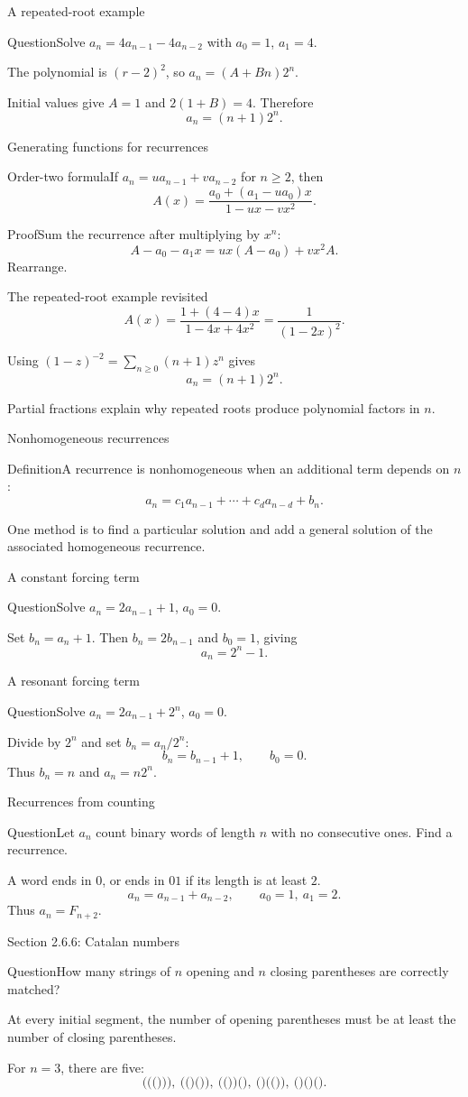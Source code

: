 \documentclass[aspectratio=169,11pt]{beamer}
\newcommand{\Def}[2]{\begin{block}{#1}#2\end{block}}
\newcommand{\Thm}[2]{\begin{block}{#1}#2\end{block}}
\renewcommand{\Proof}[1]{\begin{block}{Proof}\normalsize #1\end{block}}
\newcommand{\Question}[1]{\begin{block}{Question}#1\end{block}}
\newcommand{\gap}{\par\medskip}
\begin{document}
\begin{frame}{A repeated-root example}
\large
\Question{Solve $a_n=4a_{n-1}-4a_{n-2}$ with $a_0=1$, $a_1=4$.}
\gap The polynomial is $(r-2)^2$, so $a_n=(A+Bn)2^n$.
\gap Initial values give $A=1$ and $2(1+B)=4$. Therefore
\[a_n=(n+1)2^n.\]
\end{frame}
\begin{frame}{Generating functions for recurrences}
\large
\Thm{Order-two formula}{If $a_n=ua_{n-1}+va_{n-2}$ for $n\geq2$, then
\[A(x)=\frac{a_0+(a_1-ua_0)x}{1-ux-vx^2}.\]}
\Proof{Sum the recurrence after multiplying by $x^n$:
\[A-a_0-a_1x=ux(A-a_0)+vx^2A.\]
Rearrange.}
\end{frame}
\begin{frame}{The repeated-root example revisited}
\large
\[A(x)=\frac{1+(4-4)x}{1-4x+4x^2}=\frac1{(1-2x)^2}.\]
\gap Using $(1-z)^{-2}=\sum_{n\geq0}(n+1)z^n$ gives
\[a_n=(n+1)2^n.\]
\gap Partial fractions explain why repeated roots produce polynomial factors in $n$.
\end{frame}
\begin{frame}{Nonhomogeneous recurrences}
\large
\Def{Definition}{A recurrence is nonhomogeneous when an additional term depends on $n$:
\[a_n=c_1a_{n-1}+\cdots+c_da_{n-d}+b_n.\]}
\gap One method is to find a particular solution and add a general solution of the associated homogeneous recurrence.
\end{frame}
\begin{frame}{A constant forcing term}
\large
\Question{Solve $a_n=2a_{n-1}+1$, $a_0=0$.}
\gap Set $b_n=a_n+1$. Then $b_n=2b_{n-1}$ and $b_0=1$, giving
\[a_n=2^n-1.\]
\end{frame}
\begin{frame}{A resonant forcing term}
\large
\Question{Solve $a_n=2a_{n-1}+2^n$, $a_0=0$.}
\gap Divide by $2^n$ and set $b_n=a_n/2^n$:
\[b_n=b_{n-1}+1,\qquad b_0=0.\]
Thus $b_n=n$ and $a_n=n2^n$.
\end{frame}
\begin{frame}{Recurrences from counting}
\large
\Question{Let $a_n$ count binary words of length $n$ with no consecutive ones. Find a recurrence.}
\gap A word ends in $0$, or ends in $01$ if its length is at least $2$.
\[a_n=a_{n-1}+a_{n-2},\qquad a_0=1,\ a_1=2.\]
Thus $a_n=F_{n+2}$.
\end{frame}
\begin{frame}{Section 2.6.6: Catalan numbers}
\large
\Question{How many strings of $n$ opening and $n$ closing parentheses are correctly matched?}
\gap At every initial segment, the number of opening parentheses must be at least the number of closing parentheses.
\gap For $n=3$, there are five:
\[\texttt{((()))},\ \texttt{(()())},\ \texttt{(())()},\ \texttt{()(())},\ \texttt{()()()}.\]
\end{frame}
\end{document}
